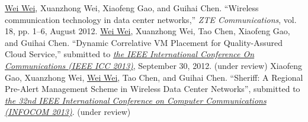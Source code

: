 \documentclass[11pt,a4paper]{moderncv}
\begin{document}


%

\begin{thebibliography}{10}
 \underline{Wei Wei}, Xuanzhong Wei, Xiaofeng Gao, and Guihai Chen. ``Wireless communication technology in data center networks,'' \emph{ZTE Communications}, vol. 18, pp. 1--6, August 2012.
\vspace{-3mm}
 \underline{Wei Wei}, Xuanzhong Wei, Tao Chen, Xiaofeng Gao, and Guihai Chen. ``Dynamic Correlative VM Placement for Quality-Assured Cloud Service,'' submitted to \href{http://www.ieee-icc.org/2013/}{\emph{the IEEE International Conference On Communications (IEEE ICC 2013)}}, September 30, 2012. (under review)
\vspace{-3mm}
 Xiaofeng Gao, Xuanzhong Wei, \underline{Wei Wei}, Tao Chen, and Guihai Chen. ``Sheriff: A Regional Pre-Alert Management Scheme in Wireless Data Center Networks'', submitted to \href{http://infocom.di.unimi.it/}{\emph{the 32nd IEEE International Conference on Computer Communications (INFOCOM 2013)}}. (under review)
\end{thebibliography}
\end{document}
